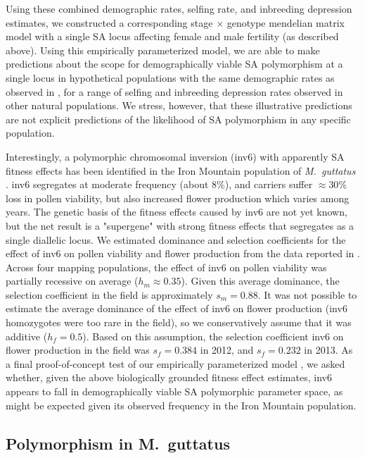 \documentclass[11pt]{article}
\begin{document}
Using these combined demographic rates, selfing rate, and inbreeding depression estimates, we constructed a corresponding stage $\times$ genotype mendelian matrix model with a single SA locus affecting female and male fertility (as described above). Using this empirically parameterized model, we are able to make predictions about the scope for demographically viable SA polymorphism at a single locus in hypothetical populations with the same demographic rates as observed in \citet{PetersonEtAl2016}, for a range of selfing and inbreeding depression rates observed in other natural populations. We stress, however, that these illustrative predictions are not explicit predictions of the likelihood of SA polymorphism in any specific population.

Interestingly, a polymorphic chromosomal inversion (inv6) with apparently SA fitness effects has been identified in the Iron Mountain population of {\itshape M.~guttatus} \citep{LeeKelly2015}. inv6 segregates at moderate frequency (about $8\%$), and carriers suffer $\approx 30 \%$ loss in pollen viability, but also increased flower production which varies among years. The genetic basis of the fitness effects caused by inv6 are not yet known, but the net result is a "supergene" with strong fitness effects that segregates as a single diallelic locus. We estimated dominance and selection coefficients for the effect of inv6 on pollen viability and flower production from the data reported in \citet{LeeKelly2015}. Across four mapping populations, the effect of inv6 on pollen viability was partially recessive on average ($h_m \approx 0.35$). Given this average dominance, the selection coefficient in the field is approximately $s_m = 0.88$. It was not possible to estimate the average dominance of the effect of inv6 on flower production (inv6 homozygotes were too rare in the field), so we conservatively assume that it was additive ($h_f = 0.5$). Based on this assumption, the selection coefficient inv6 on flower production in the field was $s_f = 0.384$ in 2012, and $s_f = 0.232$ in 2013. As a final proof-of-concept test of our empirically parameterized model \citep[e.g.,][]{Servedio2014}, we asked whether, given the above biologically grounded fitness effect estimates, inv6 appears to fall in demographically viable SA polymorphic parameter space, as might be expected given its observed frequency in the Iron Mountain population.


\subsection{Polymorphism in M.~guttatus} \label{sec:Mgutt}
\end{document}
